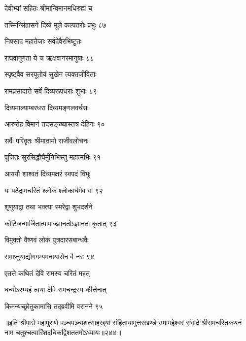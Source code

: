देवीभ्यां सहितः श्रीमान्विमानमधिरुह्य च

तस्मिन्सिंहासने दिव्ये मूले कल्पतरोः प्रभुः ८७

निषसाद महातेजाः सर्वदेवैरभिष्टुतः

राघवानुगता ये च ऋक्षवानरमानुषाः ८८

स्पृष्ट्वैव सरयूतोयं सुखेन त्यक्तजीविताः

रामप्रसादात्ते सर्वे दिव्यरूपधराः शुभाः ८९

दिव्यमाल्याम्बरधरा दिव्यमङ्गलवर्चसः

आरुरोह विमानं तदसङ्ख्यास्तत्र देहिनः ९०

सर्वैः परिवृतः श्रीमान्रामो राजीवलोचनः

पूजितः सुरसिद्धौघैर्मुनिभिस्तु महात्मभिः ९१

आययौ शाश्वतं दिव्यमक्षरं स्वपदं विभुः

यः पठेद्रामचरितं श्लोकं श्लोकार्धमेव वा ९२

शृणुयाद्वा तथा भक्त्या स्मरेद्वा शुभदर्शने

कोटिजन्मार्जितात्पापाज्ज्ञानतोऽज्ञानतः कृतात् ९३

विमुक्तो वैष्णवं लोकं पुत्रदारसबान्धवैः

समाप्नुयाद्योगगम्यमनायासेन वै नरः ९४

एतत्ते कथितं देवि रामस्य चरितं महत्

धन्योऽस्म्यहं त्वया देवि रामचन्द्रस्य कीर्त्तनात्

किमन्यच्छ्रोतुकामासि तद्ब्रवीमि वरानने ९५

॥इति श्रीपाद्मे महापुराणे पञ्चपञ्चाशत्साहस्र्यां संहितायामुत्तरखण्डे उमामहेश्वर संवादे श्रीरामचरितकथनं नाम चतुश्चत्वारिंशदधिकद्विशततमोऽध्यायः॥२४४॥



